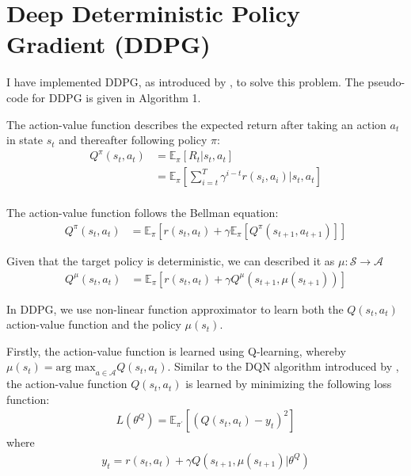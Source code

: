 \documentclass[12pt,twoside]{article}
\begin{document}




\section{Deep Deterministic Policy Gradient (DDPG)}
I have implemented DDPG, as introduced by \cite{lillicrap2015continuous}, to solve this problem. The pseudo-code for DDPG is given in Algorithm 1. 


The action-value function describes the expected return after taking an action $a_t$ in state $s_t$ and thereafter following policy $\pi$:
\begin{align*}
	Q^\pi(s_t,a_t)	& = \mathbb{E}_{\pi}\left[R_t \vert s_t, a_t\right]\\
						& = \mathbb{E}_{\pi}\left[\sum_{i=t}^T \gamma^{i-t}r(s_i,a_i)\vert s_t, a_t\right]\\
\end{align*}

The action-value function follows the Bellman equation:
\begin{align*}
	Q^\pi(s_t,a_t) &=  \mathbb{E}_\pi\left[r(s_t,a_t) + \gamma \mathbb{E}_\pi\left[Q^\pi(s_{t+1}, a_{t+1})\right] \right]
\end{align*}

Given that the target policy is deterministic, we can described it as $\mu: \mathcal{S} \rightarrow \mathcal{A}$
\begin{align*}
	Q^\mu(s_t,a_t) &=  \mathbb{E}_\pi\left[r(s_t,a_t) + \gamma Q^\mu(s_{t+1}, \mu(s_{t+1})) \right]
\end{align*}



In DDPG, we use non-linear function approximator to learn both the $Q(s_t, a_t)$ action-value function and the policy $\mu(s_t)$. 


Firstly, the action-value function is learned using Q-learning, whereby $\mu(s_t) = \text{arg max}_{a\in \mathcal{A}} Q(s_t,a_t)$. Similar to the DQN algorithm introduced by \cite{mnih2015human}, the action-value function $Q(s_t, a_t)$ is learned by minimizing the following loss function:
\begin{align*}
	L(\theta^Q) = \mathbb{E}_{\pi^\prime}\left[(Q(s_t,a_t)-y_t)^2\right]
\end{align*}
where
\begin{align*}
	y_t = r(s_t,a_t) + \gamma Q(s_{t+1}, \mu(s_{t+1})\vert \theta^Q)
\end{align*}
\end{document}

